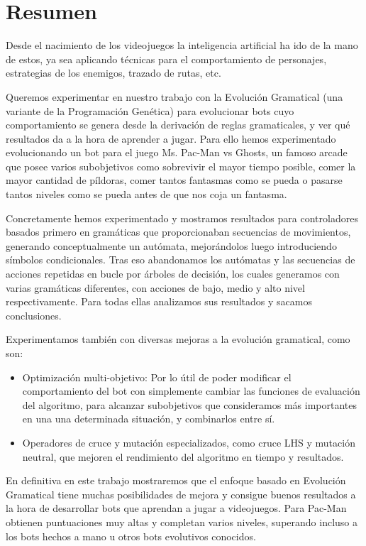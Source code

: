 \chapter{Resumen}
Desde el nacimiento de los videojuegos la inteligencia artificial ha ido de la mano de estos, ya sea aplicando técnicas para el comportamiento de personajes, estrategias de los enemigos, trazado de rutas, etc.

Queremos experimentar en nuestro trabajo con la Evolución Gramatical (una variante de la Programación Genética) para evolucionar bots cuyo comportamiento se genera desde la derivación de reglas gramaticales, y ver qué resultados da a la hora de aprender a jugar. Para ello hemos experimentado evolucionando un bot para el juego Ms. Pac-Man vs Ghosts, un famoso arcade que posee varios subobjetivos como sobrevivir el mayor tiempo posible, comer la mayor cantidad de píldoras, comer tantos fantasmas como se pueda o pasarse tantos niveles como se pueda antes de que nos coja un fantasma.
 
Concretamente hemos experimentado y mostramos resultados para controladores basados primero en gramáticas que proporcionaban secuencias de movimientos, generando conceptualmente un autómata, mejorándolos luego introduciendo símbolos condicionales. 
Tras eso abandonamos los autómatas y las secuencias de acciones repetidas en bucle por árboles de decisión, los cuales generamos con varias gramáticas diferentes, con acciones de bajo, medio y alto nivel respectivamente. Para todas ellas analizamos sus resultados y sacamos conclusiones. 
 
Experimentamos también con diversas mejoras a la evolución gramatical, como son:
\begin{itemize}
\item Optimización multi-objetivo: Por lo útil de poder modificar el comportamiento del bot con simplemente cambiar las funciones de evaluación del algoritmo, para alcanzar subobjetivos que consideramos más importantes en una una determinada situación, y combinarlos entre sí.
\item Operadores de cruce y mutación especializados, como cruce LHS y mutación neutral, que mejoren el rendimiento del algoritmo en tiempo y resultados.
\end{itemize}
 
En definitiva en este trabajo mostraremos que el enfoque basado en Evolución Gramatical tiene muchas posibilidades de mejora y consigue buenos resultados a la hora de desarrollar bots que aprendan a jugar a videojuegos. Para Pac-Man obtienen puntuaciones muy altas y completan varios niveles, superando incluso a los bots hechos a mano u otros bots evolutivos conocidos.
